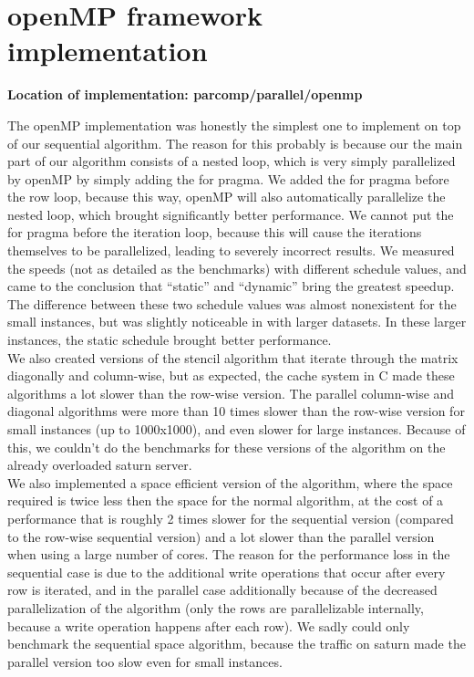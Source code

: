 \documentclass[11pt]{article}
\begin{document}
\section{openMP framework implementation}
\textbf{Location of implementation: parcomp/parallel/openmp}

The openMP implementation was honestly the simplest one to implement on top of our sequential algorithm. The reason for this probably is because our
the main part of our algorithm consists of a nested loop, which is very simply parallelized by openMP by simply adding the for pragma. We added the for pragma before the 
row loop, because this way, openMP will also automatically parallelize the nested loop, which brought significantly better performance. We cannot put the for pragma before the
iteration loop, because this will cause the iterations themselves to be parallelized, leading to severely incorrect results. We measured the speeds (not as detailed as the benchmarks)
with different schedule values, and came to the conclusion that ``static'' and ``dynamic'' bring the greatest speedup. The difference between these two schedule values
was almost nonexistent for the small instances, but was slightly noticeable in with larger datasets. In these larger instances, the static schedule brought better performance.\\
We also created versions of the stencil algorithm that iterate through the matrix diagonally and column-wise, but as expected, the cache system in C made these algorithms a lot 
slower than the row-wise version. The parallel column-wise and diagonal algorithms were more than 10 times slower than the row-wise version for small instances (up to 1000x1000),
and even slower for large instances. Because of this, we couldn't do the benchmarks for these versions of the algorithm on the already overloaded saturn server.\\
We also implemented a space efficient version of the algorithm, where the space required is twice less then the space for the normal algorithm, at the cost of a performance that is roughly 
2 times slower for the sequential version (compared to the row-wise sequential version) and a lot slower than the parallel version when using a large number of cores. The reason for the performance loss
in the sequential case is due to the additional write operations that occur after every row is iterated, and in the parallel case additionally because of the decreased parallelization of the algorithm (only the rows
are parallelizable internally, because a write operation happens after each row). We sadly could only benchmark the sequential space algorithm, because the traffic on saturn made the parallel version too slow even for small instances.\\
\end{document}
